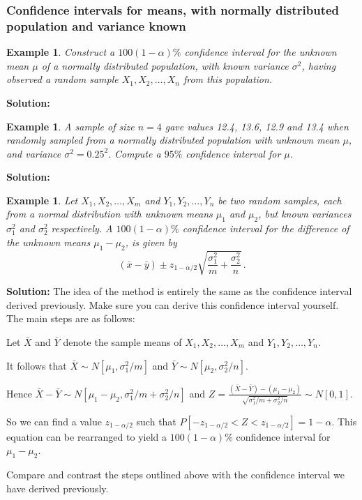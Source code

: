 \documentclass[12pt]{article}
\newtheorem{example}[theorem]{Example}
\begin{document}
\subsubsection{Confidence intervals for means, with normally distributed population and variance known}
\begin{example}
Construct a $100(1-\alpha)\%$ confidence interval for the unknown mean $\mu$ of a normally distributed population, with known variance $\sigma^{2}$, having observed a random sample $X_{1},X_{2},\ldots, X_{n}$ from this population.
\end{example}
\begin{mdframed}
{\bf Solution:}
\textcolor[rgb]{1.00,1.00,1.00}{\lipsum[1-8]}
\end{mdframed}

\begin{example}
A sample of size $n=4$ gave values 12.4, 13.6, 12.9 and 13.4 when randomly sampled from a normally distributed population with unknown mean $\mu$, and variance $\sigma^{2}=0.25^2.$ Compute a $95\%$ confidence interval for $\mu.$
\end{example}

\begin{mdframed}
{\bf Solution:}
\textcolor[rgb]{1.00,1.00,1.00}{\lipsum[1-3]}
\end{mdframed}



\begin{example}
Let $X_{1},X_{2},\ldots, X_{m}$ and $Y_{1},Y_{2},\ldots,Y_{n}$ be two random samples, each from a normal distribution with unknown means $\mu_{1}$ and $\mu_{2}$, but known variances $\sigma_{1}^{2}$ and $\sigma_{2}^{2}$ respectively. A $100(1-\alpha)\%$ confidence interval for the difference of the unknown means $\mu_{1}-\mu_{2}$, is given by $$(\bar{x}-\bar{y})\pm z_{1-\alpha/2}\sqrt{\frac{\sigma_{1}^{2}}{m}+\frac{\sigma_{2}^{2}}{n}}\, .$$
\end{example}
\begin{mdframed}
{\bf Solution:}
The idea of the method is entirely the same as the confidence interval derived previously. Make sure you can derive this confidence interval yourself. The main steps are as follows:

Let $\bar{X}$ and $\bar{Y}$ denote the sample means of $X_{1},X_{2},\ldots, X_{m}$ and $Y_{1},Y_{2},\ldots,Y_{n}$.

It follows that $\bar{X}\sim N\left[\mu_{1},\sigma_{1}^{2}/m\right]$ and $\bar{Y}\sim N\left[\mu_{2},\sigma_{2}^{2}/n\right].$

Hence $\bar{X}-\bar{Y}\sim N\left[\mu_{1}-\mu_{2},\sigma_{1}^{2}/m+\sigma_{2}^{2}/n\right]$ and $ \displaystyle Z=\frac{(\bar{X}-\bar{Y})-(\mu_{1}-\mu_{2})}{\sqrt{\sigma_{1}^{2}/m+\sigma_{2}^{2}/n}}\sim N\left[0,1\right].$

So we can find a value $z_{1-\alpha/2}$ such that $P[-z_{1-\alpha/2}<Z<z_{1-\alpha/2}]=1-\alpha.$ This equation can be rearranged to yield a $100(1-\alpha)\%$ confidence interval for $\mu_{1}-\mu_{2}$.

Compare and contrast the steps outlined above with the confidence interval we have derived previously.
\end{mdframed}
\end{document}
